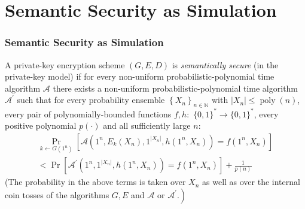 \documentclass{beamer}
\begin{document}
    \section{Semantic Security as Simulation}
    \sectionpage
    \begin{frame}
        \frametitle{Semantic Security as Simulation}
        
        \begin{definition}
            A private-key encryption scheme $(G, E, D)$ is \emph{semantically secure} (in the private-key model) if for every non-uniform probabilistic-polynomial time algorithm $\mathcal{A}$ there exists a non-uniform probabilistic-polynomial time algorithm $\mathcal{A}^{\prime}$ such that for every probability ensemble $\left\{X_{n}\right\}_{n \in \mathbb{N}}$ with $\left|X_{n}\right| \leq \operatorname{poly}(n)$, every pair of polynomially-bounded functions $f, h:$ $\{0,1\}^{*} \rightarrow\{0,1\}^{*}$, every positive polynomial $p(\cdot)$ and all sufficiently large $n:$
            $$
            \begin{aligned}
            \operatorname{Pr}_{k \leftarrow G\left(1^{n}\right)}\left[\mathcal{A}\left(1^{n}, E_{k}\left(X_{n}\right), 1^{\left|X_{n}\right|}, h\left(1^{n}, X_{n}\right)\right)=f\left(1^{n}, X_{n}\right)\right] \\
            <\operatorname{Pr}\left[\mathcal{A}^{\prime}\left(1^{n}, 1^{\left|X_{n}\right|}, h\left(1^{n}, X_{n}\right)\right)=f\left(1^{n}, X_{n}\right)\right]+\frac{1}{p(n)}
            \end{aligned}
            $$
            (The probability in the above terms is taken over $X_{n}$ as well as over the internal coin tosses of the algorithms $G, E$ and $\mathcal{A}$ or $\left.\mathcal{A}^{\prime} .\right)$
        \end{definition}
    
    \end{frame}
\end{document}
